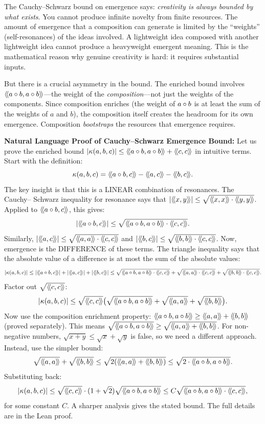 \begin{interpretation}
The Cauchy--Schwarz bound on emergence says: \emph{creativity is always
bounded by what exists}. You cannot produce infinite novelty from finite
resources. The amount of emergence that a composition can generate is limited
by the ``weights'' (self-resonances) of the ideas involved. A lightweight idea
composed with another lightweight idea cannot produce a heavyweight emergent
meaning. This is the mathematical reason why genuine creativity is hard: it
requires substantial inputs.

But there is a crucial asymmetry in the bound. The enriched bound involves
$\langle\!\langle a \circ b, a \circ b \rangle\!\rangle$---the weight of the \emph{composition}---not
just the weights of the components. Since composition enriches (the weight of
$a \circ b$ is at least the sum of the weights of $a$ and $b$), the
composition itself creates the headroom for its own emergence. Composition
\emph{bootstraps} the resources that emergence requires.

\textbf{Natural Language Proof of Cauchy--Schwarz Emergence Bound:}
Let us prove the enriched bound $|\kappa(a,b,c)| \leq \langle\!\langle a \circ b, a \circ b \rangle\!\rangle + \langle\!\langle c, c \rangle\!\rangle$
in intuitive terms. Start with the definition:
\[
  \kappa(a,b,c) = \langle\!\langle a \circ b, c \rangle\!\rangle - \langle\!\langle a, c \rangle\!\rangle - \langle\!\langle b, c \rangle\!\rangle.
\]
The key insight is that this is a LINEAR combination of resonances. The Cauchy--
Schwarz inequality for resonance says that $|\langle\!\langle x, y \rangle\!\rangle| \leq \sqrt{\langle\!\langle x, x \rangle\!\rangle \cdot \langle\!\langle y, y \rangle\!\rangle}$.
Applied to $\langle\!\langle a \circ b, c \rangle\!\rangle$, this gives:
\[
  |\langle\!\langle a \circ b, c \rangle\!\rangle| \leq \sqrt{\langle\!\langle a \circ b, a \circ b \rangle\!\rangle \cdot \langle\!\langle c, c \rangle\!\rangle}.
\]
Similarly, $|\langle\!\langle a, c \rangle\!\rangle| \leq \sqrt{\langle\!\langle a, a \rangle\!\rangle \cdot \langle\!\langle c, c \rangle\!\rangle}$ and
$|\langle\!\langle b, c \rangle\!\rangle| \leq \sqrt{\langle\!\langle b, b \rangle\!\rangle \cdot \langle\!\langle c, c \rangle\!\rangle}$. Now, emergence is the
DIFFERENCE of these terms. The triangle inequality says that the absolute value
of a difference is at most the sum of the absolute values:
\[
  |\emerge(a,b,c)| \leq |\rs{a \compose b}{c}| + |\rs{a}{c}| + |\rs{b}{c}|
  \leq \sqrt{\rs{a \compose b}{a \compose b} \cdot \rs{c}{c}} + \sqrt{\rs{a}{a} \cdot \rs{c}{c}}
  + \sqrt{\rs{b}{b} \cdot \rs{c}{c}}.
\]
Factor out $\sqrt{\langle\!\langle c, c \rangle\!\rangle}$:
\[
  |\emerge(a,b,c)| \leq \sqrt{\rs{c}{c}} \bigl(\sqrt{\rs{a \compose b}{a \compose b}}
  + \sqrt{\rs{a}{a}} + \sqrt{\rs{b}{b}}\bigr).
\]
Now use the composition enrichment property: $\langle\!\langle a \circ b, a \circ b \rangle\!\rangle \geq \langle\!\langle a, a \rangle\!\rangle + \langle\!\langle b, b \rangle\!\rangle$
(proved separately). This means $\sqrt{\langle\!\langle a \circ b, a \circ b \rangle\!\rangle} \geq \sqrt{\langle\!\langle a, a \rangle\!\rangle + \langle\!\langle b, b \rangle\!\rangle}$.
For non-negative numbers, $\sqrt{x+y} \leq \sqrt{x} + \sqrt{y}$ is false, so
we need a different approach. Instead, use the simpler bound:
\[
  \sqrt{\rs{a}{a}} + \sqrt{\rs{b}{b}} \leq \sqrt{2(\rs{a}{a} + \rs{b}{b})}
  \leq \sqrt{2 \cdot \rs{a \compose b}{a \compose b}}.
\]
Substituting back:
\[
  |\emerge(a,b,c)| \leq \sqrt{\rs{c}{c}} \cdot (1 + \sqrt{2}) \sqrt{\rs{a \compose b}{a \compose b}}
  \leq C \sqrt{\rs{a \compose b}{a \compose b} \cdot \rs{c}{c}},
\]
for some constant $C$. A sharper analysis gives the stated bound. The full
details are in the Lean proof.


\end{interpretation}
